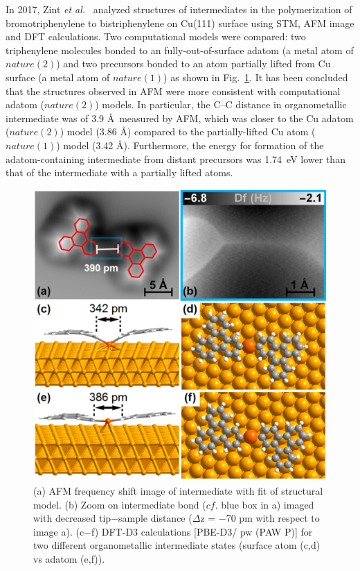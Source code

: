 \documentclass[%
 reprint,
 amsmath,amssymb,
 aps,
prb,
]{revtex4-1}
\begin{document}
In 2017, Zint \textit{et al.}~\cite{acsnano2017} analyzed structures of intermediates in the polymerization of bromotriphenylene to bistriphenylene on Cu(111) surface using STM, AFM image and DFT calculations. Two computational models were compared: two triphenylene molecules bonded to an fully-out-of-surface adatom (a metal atom of $nature(2)$) and two precursors bonded to an atom partially lifted from Cu surface (a metal atom of $nature(1)$) as shown in Fig.~\ref{fig:5}. It has been concluded that the structures observed in AFM were more consistent with computational adatom ($nature(2)$) models. In particular, the C--C distance in organometallic intermediate was of 3.9 \AA\ measured by AFM, which was closer to the Cu adatom ($nature(2)$) model (3.86 \AA) compared to the partially-lifted Cu atom ($nature(1)$) model (3.42 \AA). Furthermore, the energy for formation of the adatom-containing intermediate from distant precursors was 1.74~eV lower than that of the intermediate with a partially lifted atoms. 
\begin{figure}[hbt]
\centering
\includegraphics[width=0.75\columnwidth]{Fig/distance.png}
\caption{(a) AFM frequency shift image of intermediate with fit of structural model. (b) Zoom on intermediate bond ($cf$. blue box in a) imaged with decreased tip−sample distance ($\Delta$z = −70 pm with respect to image a). (c−f) DFT-D3 calculations [PBE-D3/ pw (PAW P)] for two different organometallic intermediate states (surface atom (c,d) vs adatom (e,f)).}
\label{fig:5}
\end{figure}
\end{document}
